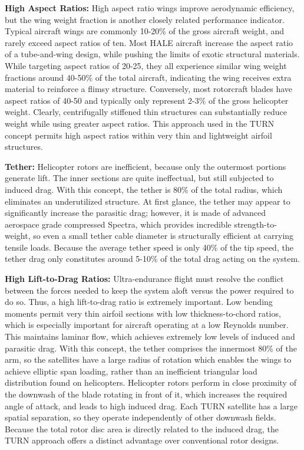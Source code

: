 \documentclass[11pt]{article}
\begin{document}
{\color{green} \bf High Aspect Ratios:}
High aspect ratio wings improve aerodynamic efficiency, but the wing weight fraction is another closely related performance indicator.  Typical aircraft wings are commonly 10-20\% of the gross aircraft weight, and rarely exceed aspect ratios of ten.  Most HALE aircraft increase the aspect ratio of a tube-and-wing design, while pushing the limits of exotic structural materials.  While targeting aspect ratios of 20-25, they all experience similar wing weight fractions around 40-50\% of the total aircraft, indicating the wing receives extra material to reinforce a flimsy structure.  Conversely, most rotorcraft blades have aspect ratios of 40-50 and typically only represent 2-3\% of the gross helicopter weight.  Clearly, centrifugally stiffened thin structures can substantially reduce weight while using greater aspect ratios.  This approach used in the TURN concept permits high aspect ratios within very thin and lightweight airfoil structures.


{\color{green} \bf Tether:}
Helicopter rotors are inefficient, because only the outermost portions generate lift.  The inner sections are quite ineffectual, but still subjected to induced drag.  With this concept, the tether is 80\% of the total radius, which eliminates an underutilized structure.  At first glance, the tether may appear to significantly increase the parasitic drag; however, it is made of advanced aerospace grade compressed Spectra, which provides incredible strength-to-weight, so even a small tether cable diameter is structurally efficient at carrying tensile loads.  Because the average tether speed is only 40\% of the tip speed, the tether drag only constitutes around 5-10\% of the total drag acting on the system.


{\color{green} \bf High Lift-to-Drag Ratios:}
Ultra-endurance flight must resolve the conflict between the forces needed to keep the system aloft versus the power required to do so.  Thus, a high lift-to-drag ratio is extremely important.  Low bending moments permit very thin airfoil sections with low thickness-to-chord ratios, which is especially important for aircraft operating at a low Reynolds number.  This maintains laminar flow, which achieves extremely low levels of induced and parasitic drag.  With this concept, the tether comprises the innermost 80\% of the arm, so the satellites have a large radius of rotation which enables the wings to achieve elliptic span loading, rather than an inefficient triangular load distribution found on helicopters.  Helicopter rotors perform in close proximity of the downwash of the blade rotating in front of it, which increases the required angle of attack, and leads to high induced drag.  Each TURN satellite has a large spatial separation, so they operate independently of other downwash fields.  Because the total rotor disc area is directly related to the induced drag, the TURN approach offers a distinct advantage over conventional rotor designs.
\end{document}

